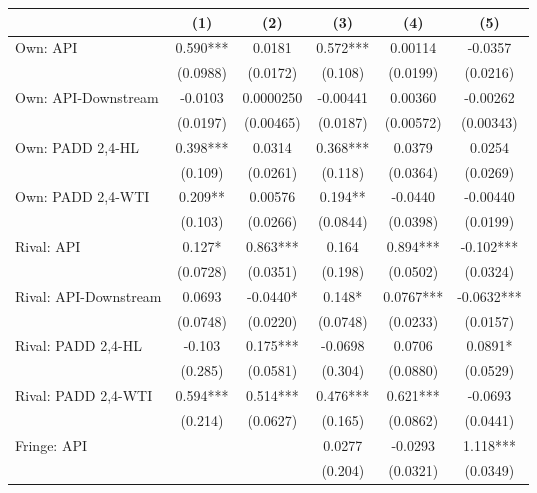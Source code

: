 {
\def\sym#1{\ifmmode^{#1}\else\(^{#1}\)\fi}
\begin{tabular}{l*{5}{c}}
\toprule
                &\multicolumn{1}{c}{(1)}   &\multicolumn{1}{c}{(2)}   &\multicolumn{1}{c}{(3)}   &\multicolumn{1}{c}{(4)}   &\multicolumn{1}{c}{(5)}   \\
\midrule
Own: API        &    0.590***&   0.0181   &    0.572***&  0.00114   &  -0.0357   \\
                & (0.0988)   & (0.0172)   &  (0.108)   & (0.0199)   & (0.0216)   \\
\addlinespace
Own: API-Downstream&  -0.0103   &0.0000250   & -0.00441   &  0.00360   & -0.00262   \\
                & (0.0197)   &(0.00465)   & (0.0187)   &(0.00572)   &(0.00343)   \\
\addlinespace
Own: PADD 2,4-HL&    0.398***&   0.0314   &    0.368***&   0.0379   &   0.0254   \\
                &  (0.109)   & (0.0261)   &  (0.118)   & (0.0364)   & (0.0269)   \\
\addlinespace
Own: PADD 2,4-WTI&    0.209** &  0.00576   &    0.194** &  -0.0440   & -0.00440   \\
                &  (0.103)   & (0.0266)   & (0.0844)   & (0.0398)   & (0.0199)   \\
\addlinespace
Rival: API      &    0.127*  &    0.863***&    0.164   &    0.894***&   -0.102***\\
                & (0.0728)   & (0.0351)   &  (0.198)   & (0.0502)   & (0.0324)   \\
\addlinespace
Rival: API-Downstream&   0.0693   &  -0.0440*  &    0.148*  &   0.0767***&  -0.0632***\\
                & (0.0748)   & (0.0220)   & (0.0748)   & (0.0233)   & (0.0157)   \\
\addlinespace
Rival: PADD 2,4-HL&   -0.103   &    0.175***&  -0.0698   &   0.0706   &   0.0891*  \\
                &  (0.285)   & (0.0581)   &  (0.304)   & (0.0880)   & (0.0529)   \\
\addlinespace
Rival: PADD 2,4-WTI&    0.594***&    0.514***&    0.476***&    0.621***&  -0.0693   \\
                &  (0.214)   & (0.0627)   &  (0.165)   & (0.0862)   & (0.0441)   \\
\addlinespace
Fringe: API     &            &            &   0.0277   &  -0.0293   &    1.118***\\
                &            &            &  (0.204)   & (0.0321)   & (0.0349)   \\

\end{tabular}}
